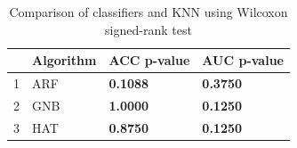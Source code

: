\begin{table}
\footnotesize
\caption{Comparison of classifiers and KNN using Wilcoxon signed-rank test}
\label{tab:wilcoxon comparison}
\begin{tabular}{llll}
\hline
 & Algorithm & ACC p-value & AUC p-value \\
\hline
1 & ARF & \textbf{0.1088} & \textbf{0.3750} \\
2 & GNB & \textbf{1.0000} & \textbf{0.1250} \\
3 & HAT & \textbf{0.8750} & \textbf{0.1250} \\
\hline
\end{tabular}
\end{table}
